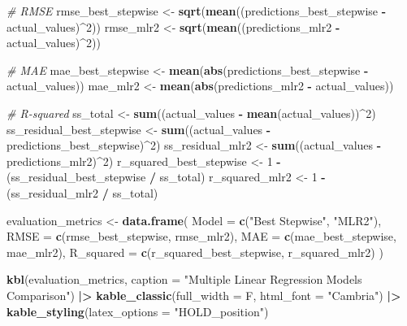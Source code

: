 \documentclass[
]{article}
\newenvironment{Shaded}{\begin{snugshade}}{\end{snugshade}}
\newcommand{\AttributeTok}[1]{\textcolor[rgb]{0.13,0.29,0.53}{#1}}
\newcommand{\CommentTok}[1]{\textcolor[rgb]{0.56,0.35,0.01}{\textit{#1}}}
\newcommand{\DecValTok}[1]{\textcolor[rgb]{0.00,0.00,0.81}{#1}}
\newcommand{\FunctionTok}[1]{\textcolor[rgb]{0.13,0.29,0.53}{\textbf{#1}}}
\newcommand{\NormalTok}[1]{#1}
\newcommand{\OtherTok}[1]{\textcolor[rgb]{0.56,0.35,0.01}{#1}}
\newcommand{\SpecialCharTok}[1]{\textcolor[rgb]{0.81,0.36,0.00}{\textbf{#1}}}
\newcommand{\StringTok}[1]{\textcolor[rgb]{0.31,0.60,0.02}{#1}}
\begin{document}
\begin{Shaded}
\begin{Highlighting}[]
\CommentTok{\# RMSE}
\NormalTok{rmse\_best\_stepwise }\OtherTok{\textless{}{-}} \FunctionTok{sqrt}\NormalTok{(}\FunctionTok{mean}\NormalTok{((predictions\_best\_stepwise }\SpecialCharTok{{-}}\NormalTok{ actual\_values)}\SpecialCharTok{\^{}}\DecValTok{2}\NormalTok{))}
\NormalTok{rmse\_mlr2 }\OtherTok{\textless{}{-}} \FunctionTok{sqrt}\NormalTok{(}\FunctionTok{mean}\NormalTok{((predictions\_mlr2 }\SpecialCharTok{{-}}\NormalTok{ actual\_values)}\SpecialCharTok{\^{}}\DecValTok{2}\NormalTok{))}

\CommentTok{\# MAE}
\NormalTok{mae\_best\_stepwise }\OtherTok{\textless{}{-}} \FunctionTok{mean}\NormalTok{(}\FunctionTok{abs}\NormalTok{(predictions\_best\_stepwise }\SpecialCharTok{{-}}\NormalTok{ actual\_values))}
\NormalTok{mae\_mlr2 }\OtherTok{\textless{}{-}} \FunctionTok{mean}\NormalTok{(}\FunctionTok{abs}\NormalTok{(predictions\_mlr2 }\SpecialCharTok{{-}}\NormalTok{ actual\_values))}

\CommentTok{\# R{-}squared}
\NormalTok{ss\_total }\OtherTok{\textless{}{-}} \FunctionTok{sum}\NormalTok{((actual\_values }\SpecialCharTok{{-}} \FunctionTok{mean}\NormalTok{(actual\_values))}\SpecialCharTok{\^{}}\DecValTok{2}\NormalTok{)}
\NormalTok{ss\_residual\_best\_stepwise }\OtherTok{\textless{}{-}} \FunctionTok{sum}\NormalTok{((actual\_values }\SpecialCharTok{{-}}\NormalTok{ predictions\_best\_stepwise)}\SpecialCharTok{\^{}}\DecValTok{2}\NormalTok{)}
\NormalTok{ss\_residual\_mlr2 }\OtherTok{\textless{}{-}} \FunctionTok{sum}\NormalTok{((actual\_values }\SpecialCharTok{{-}}\NormalTok{ predictions\_mlr2)}\SpecialCharTok{\^{}}\DecValTok{2}\NormalTok{)}
\NormalTok{r\_squared\_best\_stepwise }\OtherTok{\textless{}{-}} \DecValTok{1} \SpecialCharTok{{-}}\NormalTok{ (ss\_residual\_best\_stepwise }\SpecialCharTok{/}\NormalTok{ ss\_total)}
\NormalTok{r\_squared\_mlr2 }\OtherTok{\textless{}{-}} \DecValTok{1} \SpecialCharTok{{-}}\NormalTok{ (ss\_residual\_mlr2 }\SpecialCharTok{/}\NormalTok{ ss\_total)}

\NormalTok{evaluation\_metrics }\OtherTok{\textless{}{-}} \FunctionTok{data.frame}\NormalTok{(}
  \AttributeTok{Model =} \FunctionTok{c}\NormalTok{(}\StringTok{"Best Stepwise"}\NormalTok{, }\StringTok{"MLR2"}\NormalTok{),}
  \AttributeTok{RMSE =} \FunctionTok{c}\NormalTok{(rmse\_best\_stepwise, rmse\_mlr2),}
  \AttributeTok{MAE =} \FunctionTok{c}\NormalTok{(mae\_best\_stepwise, mae\_mlr2),}
  \AttributeTok{R\_squared =} \FunctionTok{c}\NormalTok{(r\_squared\_best\_stepwise, r\_squared\_mlr2)}
\NormalTok{)}

\FunctionTok{kbl}\NormalTok{(evaluation\_metrics, }\AttributeTok{caption =} \StringTok{"Multiple Linear Regression Models Comparison"}\NormalTok{) }\SpecialCharTok{|\textgreater{}}
  \FunctionTok{kable\_classic}\NormalTok{(}\AttributeTok{full\_width =}\NormalTok{ F, }\AttributeTok{html\_font =} \StringTok{"Cambria"}\NormalTok{) }\SpecialCharTok{|\textgreater{}}
  \FunctionTok{kable\_styling}\NormalTok{(}\AttributeTok{latex\_options =} \StringTok{"HOLD\_position"}\NormalTok{)}


\end{Highlighting}
\end{Shaded}
\end{document}
